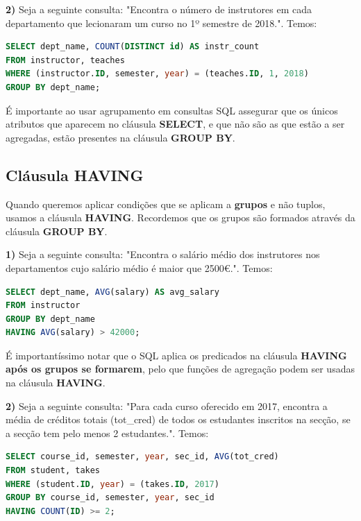 \documentclass[oneside]{book}
\theoremstyle{definition}
\begin{document}
\textbf{2)} Seja a seguinte consulta: "Encontra o número de instrutores em cada departamento que lecionaram um curso no 1º semestre de 2018.". Temos:
\begin{lstlisting}[language=SQL, morekeywords={REFERENCES, REFRESH, MATERIALIZED, CONCURRENTLY}, framesep=8pt, xleftmargin=40pt, framexleftmargin=40pt, frame=tb, framerule=0pt]
SELECT dept_name, COUNT(DISTINCT id) AS instr_count
FROM instructor, teaches
WHERE (instructor.ID, semester, year) = (teaches.ID, 1, 2018)
GROUP BY dept_name;
\end{lstlisting}

É importante ao usar agrupamento em consultas SQL assegurar que os únicos atributos que aparecem no cláusula \textbf{SELECT}, e que não são as que estão a ser agregadas, estão presentes na cláusula \textbf{GROUP BY}.

\subsection{Cláusula HAVING}
Quando queremos aplicar condições que se aplicam a \textbf{grupos} e não tuplos, usamos a cláusula \textbf{HAVING}. Recordemos que os grupos são formados através da cláusula \textbf{GROUP BY}.

\textbf{1)} Seja a seguinte consulta: "Encontra o salário médio dos instrutores nos departamentos cujo salário médio é maior que 2500€.". Temos:
\begin{lstlisting}[language=SQL, morekeywords={REFERENCES, REFRESH, MATERIALIZED, CONCURRENTLY}, framesep=8pt, xleftmargin=40pt, framexleftmargin=40pt, frame=tb, framerule=0pt]
SELECT dept_name, AVG(salary) AS avg_salary
FROM instructor
GROUP BY dept_name
HAVING AVG(salary) > 42000;
\end{lstlisting}
É importantíssimo notar que o SQL aplica os predicados na cláusula \textbf{HAVING} \textbf{após os grupos se formarem}, pelo que funções de agregação podem ser usadas na cláusula \textbf{HAVING}.

\textbf{2)} Seja a seguinte consulta: "Para cada curso oferecido em 2017, encontra a média de créditos totais (tot\_cred) de todos os estudantes inscritos na secção, se a secção tem pelo menos 2 estudantes.". Temos:
\begin{lstlisting}[language=SQL, morekeywords={REFERENCES, REFRESH, MATERIALIZED, CONCURRENTLY}, framesep=8pt, xleftmargin=40pt, framexleftmargin=40pt, frame=tb, framerule=0pt]
SELECT course_id, semester, year, sec_id, AVG(tot_cred)
FROM student, takes
WHERE (student.ID, year) = (takes.ID, 2017)
GROUP BY course_id, semester, year, sec_id
HAVING COUNT(ID) >= 2;
\end{lstlisting}
\end{document}
